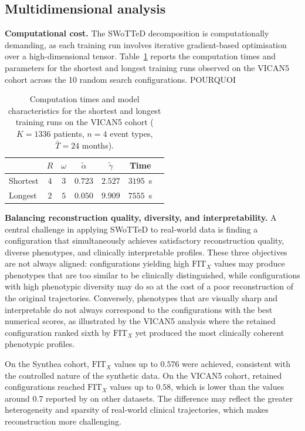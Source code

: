 \documentclass[pdflatex,sn-mathphys-num,referee,lineno]{sn-jnl}
\begin{document}
\subsection{Multidimensional analysis}\label{sec:disc_multi}

\textbf{Computational cost.}
The SWoTTeD decomposition is computationally demanding, as each training run involves iterative gradient-based optimisation over a high-dimensional tensor.
Table~\ref{tab:compute_vican5} reports the computation times and parameters for the shortest and longest training runs observed on the VICAN5 cohort across the 10 random search configurations.
POURQUOI

\begin{table}[htbp]
\centering
\caption{Computation times and model characteristics for the shortest and longest training runs on the VICAN5 cohort ($K=1 336$ patients, $n=4$ event types, $\bar{T}=24$ months).}
\label{tab:compute_vican5}
\begin{tabular}{lcccccc}
\toprule
 & $R$ & $\omega$ & $\tilde{\alpha}$ & $\tilde{\gamma}$ & Time \\
\midrule
Shortest & $4$ & $3$ & $0.723$ & $2.527$ & $3 195$~s \\
Longest  & $2$ & $5$ & $0.050$ & $9.909$ & $7 555$~s \\
\bottomrule
\end{tabular}
\end{table}

\textbf{Balancing reconstruction quality, diversity, and interpretability.}
A central challenge in applying SWoTTeD to real-world data is finding a configuration that simultaneously achieves satisfactory reconstruction quality, diverse phenotypes, and clinically interpretable profiles.
These three objectives are not always aligned: configurations yielding high $\text{FIT}_X$ values may produce phenotypes that are too similar to be clinically distinguished, while configurations with high phenotypic diversity may do so at the cost of a poor reconstruction of the original trajectories.
Conversely, phenotypes that are visually sharp and interpretable do not always correspond to the configurations with the best numerical scores, as illustrated by the VICAN5 analysis where the retained configuration ranked sixth by $\text{FIT}_X$ yet produced the most clinically coherent phenotypic profiles.

On the Synthea cohort, $\text{FIT}_X$ values up to $0.576$ were achieved, consistent with the controlled nature of the synthetic data.
On the VICAN5 cohort, retained configurations reached $\text{FIT}_X$ values up to $0.58$, which is lower than the values around $0.7$ reported by \cite{sebia2024swotted} on other datasets.
The difference may reflect the greater heterogeneity and sparsity of real-world clinical trajectories, which makes reconstruction more challenging.
\end{document}
